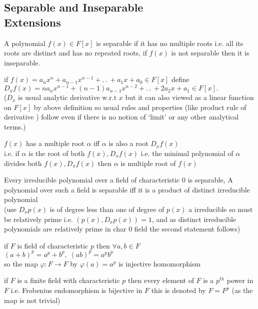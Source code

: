 \documentclass[11pt]{extarticle}
\newcommand{\ra}{\rightarrow}
\newcommand{\ck}{.\,.\,}
\newcommand{\snote}[1]{{\footnotesize(#1)}}
\newcommand{\tbx}[2][]{
\begin{tcolorbox}[enhanced,breakable,size=small,colback=black!2!white,title={#1},arc is angular, arc=1.5mm,drop fuzzy shadow]
	#2
\end{tcolorbox}
}
\begin{document}
\begin{multicols}{2}
\subsection{Separable and Inseparable\\ Extensions}
\tbx[Separable and Inseparable]{ A polynomial $ f(x)\in F[x] $ is separable if it has no multiple roots i.e. all its roots are distinct and has no repeated roots, if $ f(x) $ is not separable then it is inseparable.}
\tbx[Algebraic definition of Derivative ]{ if $ f(x)=a_nx^n+a_{n-1}x^{n-1}+\ck +a_1x+a_0 \in  F[x]$ define\\
$ D_xf(x)= na_nx^{n-1}+(n-1)a_{n-1}x^{n-2}+\ck+2a_2x+a_1\in F[x]. $  \\
\snote{$ D_x $ is usual analytic derivative w.r.t $ x $ but it can also viewed as a linear function on $ F[x] $ by above definition so usual rules and properties \snote{like product rule of derivative } follow even if there is no notion of `limit' or any other analytical terms.}}
\tbx[Test for multiple root]{ $ f(x) $ has a multiple root $ \alpha $ iff $ \alpha $ is also a root $ D_xf(x) $ \\
i.e. if $ \alpha $ is the root of both $ f(x),D_xf(x) $ i.e. the minimal polynomial of $ \alpha $ divides both $ f(x),D_xf(x) $ then $ \alpha $ is multiple root of $ f(x) $}
\tbx{ Every irreducible polynomial over a field of characteristic $ 0$ is separable, A polynomial over such a field is separable iff it is a product of distinct irreducible polynomial \\
\snote{use $ D_x p(x) $ is of degree less than one of degree of $ p(x) $ a irreducible so must be relatively prime i.e. $ (p(x),D_xp(x))=1 $, and as distinct irreducible polynomials are relatively prime in char 0 field the second statement follows}
}
\tbx[Frobenius endomorphism]{  if $ F$ is field of characteristic $ p $ then $ \forall a,b\in F $ \\
$ (a+b)^p=a^p+b^p,\; (ab)^p=a^pb^p $ \\
so the map $ \varphi : F\ra F $ by $ \varphi(a)=a^p $ is injective homomorphism }
\tbx{ if $ F $ is a finite field with characteristic $ p $ then every element of $ F $ is a $ p^{th} $ power in $ F $ i.e. Frobenius endomorphism is bijective in $ F $ this is denoted by $ F=F^p $ \snote{as the map is not trivial} }

\end{multicols}
\end{document}
